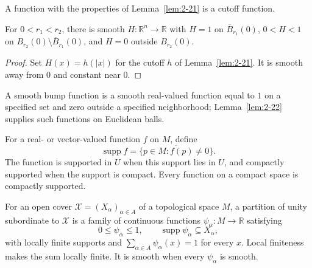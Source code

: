 \begin{definition}
\label{def:2-10-extra-1}
\leanok
{}
A function with the properties of Lemma~\ref{lem:2-21} is a cutoff function.
\end{definition}

\begin{lemma}
\label{lem:2-22}
\leanok
{}
For $0<r_1<r_2$, there is smooth $H:\mathbb R^n\to\mathbb R$ with $H=1$ on $\overline B_{r_1}(0)$, $0<H<1$ on $B_{r_2}(0)\setminus\overline B_{r_1}(0)$, and $H=0$ outside $B_{r_2}(0)$.
\end{lemma}

\begin{proof}
\leanok
\sketch Set $H(x)=h(|x|)$ for the cutoff $h$ of Lemma~\ref{lem:2-21}. It is smooth away from $0$ and constant near $0$.
\end{proof}

\begin{definition}
\label{def:2-10-extra-2}
\mathlibok
{}
A smooth bump function is a smooth real-valued function equal to $1$ on a specified set and zero outside a specified neighborhood; Lemma~\ref{lem:2-22} supplies such functions on Euclidean balls.
\end{definition}

\begin{definition}
\label{def:2-10-extra-3}
\mathlibok
For a real- or vector-valued function $f$ on $M$, define
\[
\operatorname{supp}f=\overline{\{p\in M:f(p)\neq0\}}.
\]
The function is supported in $U$ when this support lies in $U$, and compactly supported when the support is compact. Every function on a compact space is compactly supported.
\end{definition}

\begin{definition}
\label{def:2-10-extra-4}
\mathlibok
For an open cover $\mathcal X=(X_\alpha)_{\alpha\in A}$ of a topological space $M$, a partition of unity subordinate to $\mathcal X$ is a family of continuous functions $\psi_\alpha:M\to\mathbb R$ satisfying
\[
0\leq\psi_\alpha\leq1,\qquad \operatorname{supp}\psi_\alpha\subseteq X_\alpha,
\]
with locally finite supports and $\sum_{\alpha\in A}\psi_\alpha(x)=1$ for every $x$. Local finiteness makes the sum locally finite. It is smooth when every $\psi_\alpha$ is smooth.
\end{definition}

